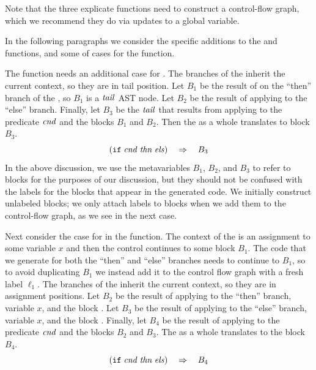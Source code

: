 \documentclass[11pt]{book}
\begin{document}
Note that the three explicate functions need to construct a
control-flow graph, which we recommend they do via updates to a global
variable.

In the following paragraphs we consider the specific additions to the
 and  functions, and some
of cases for the  function.

The  function needs an additional case for
. The branches of the  inherit the current context, so
they are in tail position.  Let $B_1$ be the result of
 on the ``then'' branch of the , so $B_1$
is a $\mathit{tail}$ AST node.  Let $B_2$ be the result of applying
 to the ``else'' branch. Finally, let $B_3$ be
the $\mathit{tail}$ that results from applying  to the
predicate $\mathit{cnd}$ and the blocks $B_1$ and $B_2$.  Then the
 as a whole translates to block $B_3$.
\[
    (\texttt{if}\; \mathit{cnd}\; \mathit{thn}\; \mathit{els}) \quad\Rightarrow\quad B_3
\]
In the above discussion, we use the metavariables $B_1$, $B_2$, and
$B_3$ to refer to blocks for the purposes of our discussion, but they
should not be confused with the labels for the blocks that appear in
the generated code. We initially construct unlabeled blocks; we only
attach labels to blocks when we add them to the control-flow graph, as
we see in the next case.

Next consider the case for  in the 
function. The context of the  is an assignment to some
variable $x$ and then the control continues to some block $B_1$.  The
code that we generate for both the ``then'' and ``else'' branches
needs to continue to $B_1$, so to avoid duplicating $B_1$ we instead
add it to the control flow graph with a fresh label $\ell_1$. The
branches of the  inherit the current context, so they are in
assignment positions.  Let $B_2$ be the result of applying
 to the ``then'' branch, variable $x$, and the
block .  Let $B_3$ be the result of applying
 to the ``else'' branch, variable $x$, and the
block . Finally, let $B_4$ be the result of applying
 to the predicate $\mathit{cnd}$ and the blocks
$B_2$ and $B_3$. The  as a whole translates to the block
$B_4$.
\[
(\texttt{if}\; \mathit{cnd}\; \mathit{thn}\; \mathit{els}) \quad\Rightarrow\quad B_4
\]
\end{document}
